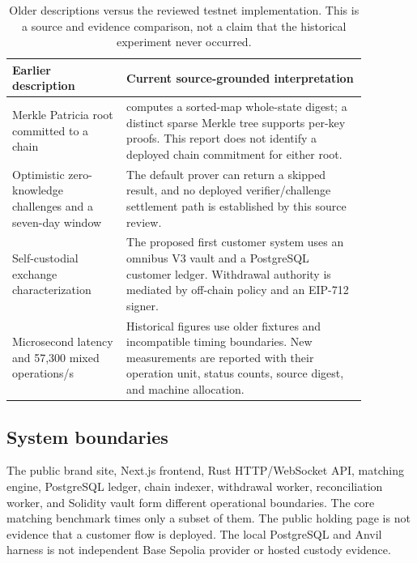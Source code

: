 \documentclass[envcountsame,runningheads,notitlepage]{llncs}
\newcommand{\pathref}[1]{\texttt{\detokenize{#1}}}
\begin{document}
\begin{table}[h]
\centering\small
\begin{tabular}{p{0.28\linewidth}p{0.59\linewidth}}
\toprule
Earlier description & Current source-grounded interpretation \\
\midrule
Merkle Patricia root committed to a chain & \pathref{MptStore} computes a sorted-map whole-state digest; a distinct sparse Merkle tree supports per-key proofs. This report does not identify a deployed chain commitment for either root. \\
Optimistic zero-knowledge challenges and a seven-day window & The default prover can return a skipped result, and no deployed verifier/challenge settlement path is established by this source review. \\
Self-custodial exchange characterization & The proposed first customer system uses an omnibus V3 vault and a PostgreSQL customer ledger. Withdrawal authority is mediated by off-chain policy and an EIP-712 signer. \\
Microsecond latency and 57,300 mixed operations/s & Historical figures use older fixtures and incompatible timing boundaries. New measurements are reported with their operation unit, status counts, source digest, and machine allocation. \\
\bottomrule
\end{tabular}
\caption{Older descriptions versus the reviewed testnet implementation. This is a source and evidence comparison, not a claim that the historical experiment never occurred.}\label{tab:priorclaims}
\end{table}

\subsection{System boundaries}
The public brand site, Next.js frontend, Rust HTTP/WebSocket API, matching engine, PostgreSQL ledger, chain indexer, withdrawal worker, reconciliation worker, and Solidity vault form different operational boundaries. The core matching benchmark times only a subset of them. The public holding page is not evidence that a customer flow is deployed. The local PostgreSQL and Anvil harness is not independent Base Sepolia provider or hosted custody evidence.\cite{staging}
\end{document}
